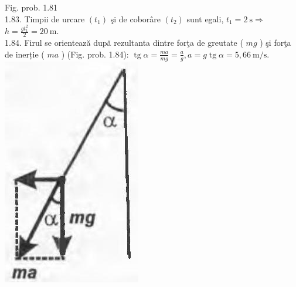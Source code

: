 \documentclass[10pt]{article}
\begin{document}
Fig. prob. 1.81\\
1.83. Timpii de urcare $\left(t_{1}\right)$ şi de coborâre $\left(t_{2}\right)$ sunt egali, $t_{1}=2 \mathrm{~s} \Rightarrow$ $h=\frac{g t_{1}^{2}}{2}=20 \mathrm{~m}$.\\
1.84. Firul se orientează după rezultanta dintre forţa de greutate ( $m g$ ) şi forţa de inerție ( $m a$ ) (Fig. prob. 1.84): $\operatorname{tg} \alpha=\frac{m a}{m g}=\frac{a}{g}, a=g \operatorname{tg} \alpha=5,66 \mathrm{~m} / \mathrm{s}$.\\
\includegraphics[max width=\textwidth, center]{2025_07_01_5b3ff9fa0d508c8e9f17g-213(1)}
\end{document}
